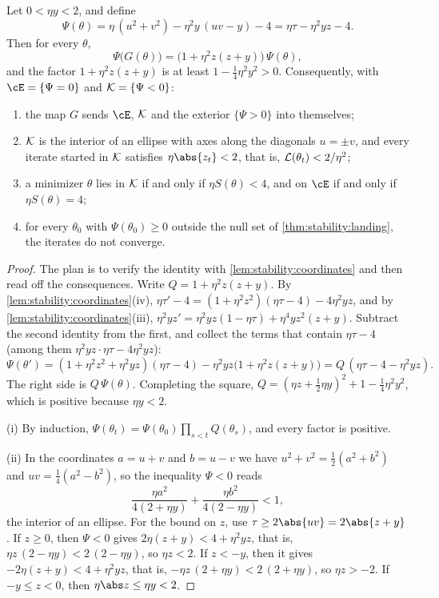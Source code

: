 \begin{refsection}
\begin{theorem}\label{thm:stability:ellipse}
Let $0<\eta y<2$, and define
\[
  \Psi(\theta)=\eta\,(u^2+v^2)-\eta^2y\,(uv-y)-4=\eta\tau-\eta^2yz-4 .
\]
Then for every $\theta$,
\begin{equation}\label{eq:stability:psi}
  \Psi\bigl(G(\theta)\bigr)=\bigl(1+\eta^2z(z+y)\bigr)\,\Psi(\theta),
\end{equation}
and the factor $1+\eta^2z(z+y)$ is at least $1-\frac14\eta^2y^2>0$. Consequently, with $\cE=\{\Psi=0\}$ and $\mathcal{K}=\{\Psi<0\}$:
\begin{enumerate}
\item the map $G$ sends $\cE$, $\mathcal{K}$ and the exterior $\{\Psi>0\}$ into themselves;
\item $\mathcal{K}$ is the interior of an ellipse with axes along the diagonals $u=\pm v$, and every iterate started in $\mathcal{K}$ satisfies $\eta\abs{z_t}<2$, that is, $\mathcal{L}(\theta_t)<2/\eta^2$;
\item a minimizer $\theta$ lies in $\mathcal{K}$ if and only if $\eta S(\theta)<4$, and on $\cE$ if and only if $\eta S(\theta)=4$;
\item for every $\theta_0$ with $\Psi(\theta_0)\ge0$ outside the null set of \cref{thm:stability:landing}, the iterates do not converge.
\end{enumerate}
\end{theorem}

\begin{proof}
The plan is to verify the identity with \cref{lem:stability:coordinates} and then read off the consequences. Write $Q=1+\eta^2z(z+y)$. By \cref{lem:stability:coordinates}(iv), $\eta\tau'-4=(1+\eta^2z^2)(\eta\tau-4)-4\eta^2yz$, and by \cref{lem:stability:coordinates}(iii), $\eta^2yz'=\eta^2yz(1-\eta\tau)+\eta^4yz^2(z+y)$. Subtract the second identity from the first, and collect the terms that contain $\eta\tau-4$ (among them $\eta^2yz\cdot\eta\tau-4\eta^2yz$):
\[
  \Psi(\theta')=(1+\eta^2z^2+\eta^2yz)(\eta\tau-4)-\eta^2yz\bigl(1+\eta^2z(z+y)\bigr)=Q\,(\eta\tau-4-\eta^2yz).
\]
The right side is $Q\,\Psi(\theta)$.
Completing the square, $Q=(\eta z+\frac12\eta y)^2+1-\frac14\eta^2y^2$, which is positive because $\eta y<2$.

(i) By induction, $\Psi(\theta_t)=\Psi(\theta_0)\prod_{s<t}Q(\theta_s)$, and every factor is positive.

(ii) In the coordinates $a=u+v$ and $b=u-v$ we have $u^2+v^2=\frac12(a^2+b^2)$ and $uv=\frac14(a^2-b^2)$, so the inequality $\Psi<0$ reads
\[
  \frac{\eta a^2}{4(2+\eta y)}+\frac{\eta b^2}{4(2-\eta y)}<1 ,
\]
the interior of an ellipse. For the bound on $z$, use $\tau\ge2\abs{uv}=2\abs{z+y}$. If $z\ge0$, then $\Psi<0$ gives $2\eta(z+y)<4+\eta^2yz$, that is, $\eta z\,(2-\eta y)<2\,(2-\eta y)$, so $\eta z<2$. If $z<-y$, then it gives $-2\eta(z+y)<4+\eta^2yz$, that is, $-\eta z\,(2+\eta y)<2\,(2+\eta y)$, so $\eta z>-2$. If $-y\le z<0$, then $\eta\abs z\le\eta y<2$.


\end{proof}
\end{refsection}
